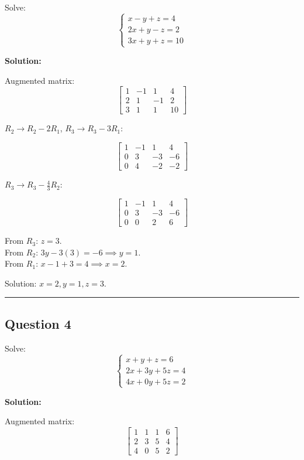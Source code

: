 \documentclass[
  letterpaper,
  DIV=11,
  numbers=noendperiod]{scrreprt}
\begin{document}
Solve: \[
\begin{cases}
x - y + z = 4 \\
2x + y - z = 2 \\
3x + y + z = 10
\end{cases}
\]

\textbf{Solution:}

Augmented matrix: \[
\begin{bmatrix}
1 & -1 & 1 & 4 \\
2 & 1 & -1 & 2 \\
3 & 1 & 1 & 10
\end{bmatrix}
\]

\(R_2 \rightarrow R_2 - 2R_1\), \(R_3 \rightarrow R_3 - 3R_1\):

\[
\begin{bmatrix}
1 & -1 & 1 & 4 \\
0 & 3 & -3 & -6 \\
0 & 4 & -2 & -2
\end{bmatrix}
\]

\(R_3 \rightarrow R_3 - \frac{4}{3}R_2\):

\[
\begin{bmatrix}
1 & -1 & 1 & 4 \\
0 & 3 & -3 & -6 \\
0 & 0 & 2 & 6
\end{bmatrix}
\]

From \(R_3\): \(z = 3\).\\
From \(R_2\): \(3y - 3(3) = -6 \implies y = 1\).\\
From \(R_1\): \(x - 1 + 3 = 4 \implies x = 2\).

Solution: \(\boxed{x=2, y=1, z=3}\).

\begin{center}\rule{0.5\linewidth}{0.5pt}\end{center}

\subsection{Question 4}\label{question-4}

Solve: \[
\begin{cases}
x + y + z = 6 \\
2x + 3y + 5z = 4 \\
4x + 0y + 5z = 2
\end{cases}
\]

\textbf{Solution:}

Augmented matrix: \[
\begin{bmatrix}
1 & 1 & 1 & 6 \\
2 & 3 & 5 & 4 \\
4 & 0 & 5 & 2
\end{bmatrix}
\]
\end{document}
